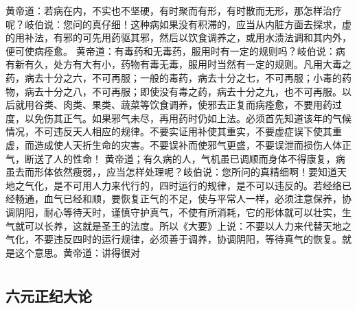 \documentclass[12pt,UTF8]{ctexbook}
\begin{document}
黄帝道：若病在内，不实也不坚硬，有时聚而有形，有时散而无形，那怎样治疗呢？岐伯说：您问的真仔细！这种病如果没有积滞的，应当从内脏方面去探求，虚的用补法，有邪的可先用药驱其邪，然后以饮食调养之，或用水渍法调和其内外，便可使病痊愈。
黄帝道：有毒药和无毒药，服用时有一定的规则吗？岐伯说：病有新有久，处方有大有小，药物有毒无毒，服用时当然有一定的规则。凡用大毒之药，病去十分之六，不可再服；一般的毒药，病去十分之七，不可再服；小毒的药物，病去十分之八，不可再服；即使没有毒之药，病去十分之九，也不可再服。以后就用谷类、肉类、果类、蔬菜等饮食调养，使邪去正复而病痊愈，不要用药过度，以免伤其正气。如果邪气未尽，再用药时仍如上法。必须首先知道该年的气候情况，不可违反天人相应的规律。不要实证用补使其重实，不要虚症误下使其重虚，而造成使人天折生命的灾害。不要误补而使邪气更盛，不要误泄而损伤人体正气，断送了人的性命！
黄帝道；有久病的人，气机虽已调顺而身体不得康复，病虽去而形体依然瘦弱，，应当怎样处理呢？岐伯说：您所问的真精细啊！要知道天地之气化，是不可用人力来代行的，四时运行的规律，是不可以违反的。若经络已经畅通，血气已经和顺，要恢复正气的不足，使与平常人一样，必须注意保养，协调阴阳，耐心等待天时，谨慎守护真气，不使有所消耗，它的形体就可以壮实，生气就可以长养，这就是圣王的法度。所以《大要》上说：不要以人力来代替天地之气化，不要违反四时的运行规律，必须善于调养，协调阴阳，等待真气的恢复。就是这个意思。黄帝道：讲得很对

\part{}

\chapter{六元正纪大论}
\end{document}
